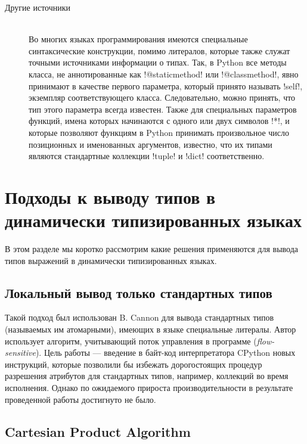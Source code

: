 \begin{description}
    \item[Другие источники] \hfill \\
        Во многих языках программирования имеются специальные синтаксические
        конструкции, помимо литералов, которые также служат точными источниками
        информации о типах. Так, в Python все методы класса, не аннотированные
        как !@staticmethod! или !@classmethod!, явно принимают в качестве первого
        параметра, который принято называть !self!, экземпляр соответствующего
        класса. Следовательно, можно принять, что тип этого параметра всегда
        известен.  Также для специальных параметров функций, имена которых
        начинаются с одного или двух символов !*!, и которые позволяют функциям в
        Python принимать произвольное число позиционных и именованных аргументов,
        известно, что их типами являются стандартные коллекции !tuple! и !dict!
        соответственно.

\end{description}
     
\section{Подходы к выводу типов в динамически типизированных языках}

В этом разделе мы коротко рассмотрим какие решения применяются для вывода
типов выражений в динамически типизированных языках.

\subsection{Локальный вывод только стандартных типов}

Такой подход был использован B. Cannon для вывода стандартных типов (называемых им
атомарными), имеющих в языке специальные литералы. Автор использует алгоритм,
учитывающий поток управления в программе (\emph{flow-sensitive}). Цель работы
--- введение в байт-код интерпретатора CPython новых инструкций, которые
позволили бы избежать дорогостоящих процедур разрешения атрибутов для
стандартных типов, например, коллекций во время исполнения. Однако по ожидаемого
прироста производительности в результате проведенной работы достигнуто не было.

\subsection{Cartesian Product Algorithm}
\label{sub:cpa-algorithm}

